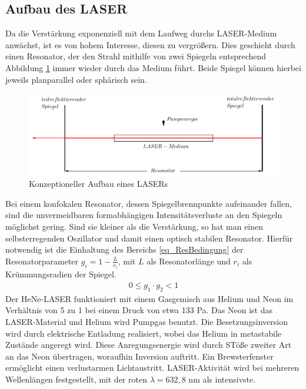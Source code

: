 \subsection{Aufbau des LASER}
Da die Verstärkung exponenziell mit dem Laufweg durchs LASER-Medium anwächst, ist es von hohem Interesse, diesen zu vergrößern. Dies geschieht durch
einen Resonator, der den Strahl mithilfe von zwei Spiegeln entsprechend Abbildung \ref{pic_Res} immer wieder durch das Medium führt. Beide Spiegel
können hierbei jeweils planparallel oder sphärisch sein. 
\begin{figure}[H]
\includegraphics[width=\textwidth]{pics/Res.png}
\caption{Konzeptioneller Aufbau eines LASERs}
\label{pic_Res}
\end{figure}
Bei einem konfokalen Resonator, dessen Spiegelbrennpunkte aufeinander fallen, sind die
unvermeidbaren formabhängigen Intensitätsverluste an den Spiegeln möglichst gering. Sind sie kleiner als die Verstärkung, so hat man einen selbsterregenden Oszillator
und damit einen optisch stabilen Resonator. Hierfür notwendig ist die Einhaltung des Bereichs \eqref{eq_ResBedingung} der Resonatorparameter $g_i = 1- \frac{L}{r_i}$, mit $L$ 
als Resonatorlänge und $r_i$ als Krümmungsradien der Spiegel.
\begin{align}
 0 \le g_1 \cdot g_2 < 1
 \label{eq_ResBedingung}
\end{align}
Der HeNe-LASER funktioniert mit einem Gasgemisch aus Helium und Neon im Verhältnis von 5 zu 1 bei einem Druck von etwa 133 Pa. Das Neon ist das 
LASER-Material und Helium wird Pumpgas benutzt. Die Besetzungsinversion wird durch elektrische Entladung realisiert, wobei das Helium in
metastabile Zustände angeregt wird. Diese Anregungsenergie wird durch STöße zweiter Art an das Neon übertragen, woraufhin Inversion auftritt. 
Ein Brewsterfenster ermöglicht einen verlustarmen Lichtaustritt. LASER-Aktivität wird bei mehreren Wellenlängen festgestellt, mit der roten $\lambda = 632,8$ nm
als intensivste.

